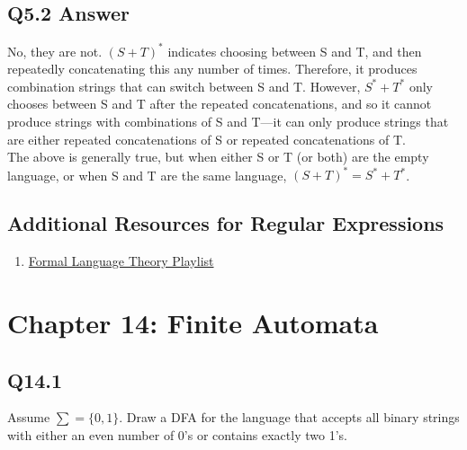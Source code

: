 \documentclass{article}
\begin{document}
\subsection*{Q5.2 Answer}
No, they are not. $(S+T)^*$ indicates choosing between S and T, and then repeatedly concatenating this any number of times. Therefore, it produces combination strings that can switch between S and T. However, $S^*+T^*$ only chooses between S and T after the repeated concatenations, and so it cannot produce strings with combinations of S and T---it can only produce strings that are either repeated concatenations of S or repeated concatenations of T. 
\\ The above is generally true, but when either S or T (or both) are the empty language, or when S and T are the same language, $(S+T)^*=S^*+T^*$.
\newpage
\subsection*{Additional Resources for Regular Expressions}
\begin{enumerate}
    \item \href{https://www.youtube.com/playlist?list=PLBlnK6fEyqRgp46KUv4ZY69yXmpwKOIev}{Formal Language Theory Playlist}
\end{enumerate}
\newpage

\section*{Chapter 14: Finite Automata}

\subsection*{Q14.1}
Assume $\sum=\{0,1\}$. Draw a DFA for the language that accepts all binary strings with either an even number of 0's or contains exactly two 1's.
\newpage
\end{document}
